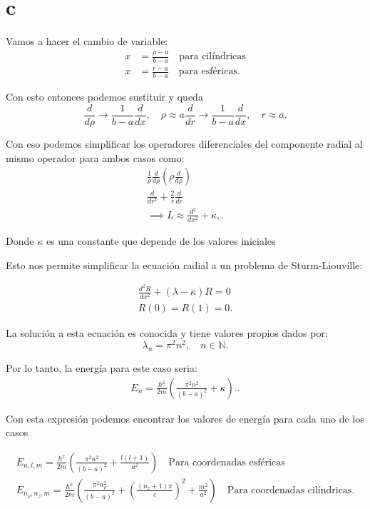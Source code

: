 \documentclass{report}
\begin{document}
\section{c}

Vamos a hacer el cambio de variable:
\begin{align*}
  x &= \frac{\rho - a}{b - a} \quad \text{para cilíndricas}\\
  x &= \frac{r - a}{b - a} \quad \text{para esféricas}
.\end{align*}

Con esto entonces podemos sustituir y queda
\[
\frac{d}{d\rho} \to \frac{1}{b - a} \frac{d}{dx}, \quad \rho \approx a
\frac{d}{dr} \to \frac{1}{b - a} \frac{d}{dx}, \quad r \approx a.
\]

Con eso podemos simplificar los operadores diferenciales del componente radial al mismo operador para ambos casos como:
\begin{align*}
  \frac{1}{\rho} \frac{d}{d\rho} \left( \rho \frac{d}{d\rho} \right)\\
  \frac{d}{dr^2} + \frac{2}{r} \frac{d}{dr}\\
  \implies L \approx \frac{d^2}{dx^2} + \kappa,
.\end{align*}

Donde $\kappa$ es una constante que depende de los valores iniciales

Esto nos permite simplificar la ecuación radial a un problema de Sturm-Liouville:

\begin{align*}
  \frac{d^2R}{dx^2} + \left( \lambda - \kappa \right) R = 0\\
  R(0) = R(1) = 0
.\end{align*}

La solución a esta ecuación es conocida y tiene valores propios dados por:
\[
\lambda_n = \pi^2 n^2, \quad n \in \mathbb{N}.
\]

Por lo tanto, la energía para este caso seria:
\begin{align*}
E_n = \frac{\hbar^2}{2m} \left( \frac{\pi^2 n^2}{(b - a)^2} + \kappa \right).
.\end{align*}

Con esta expresión podemos encontrar los valores de energía para cada uno de los casos

\begin{align*}
   E_{n,l,m} = \frac{\hbar^2}{2m} \left( \frac{\pi^2 n^2}{(b - a)^2} + \frac{l(l+1)}{a^2} \right) \quad\text{Para coordenadas esféricas} \\
   E_{n_\rho, n_z, m} = \frac{\hbar^2}{2m} \left( \frac{\pi^2 n_\rho^2}{(b - a)^2} + \left(\frac{(n_z + 1)\pi}{c}\right)^2 + \frac{m^2}{a^2} \right) \quad \text{Para coordenadas cilíndricas}
.\end{align*}
\end{document}
